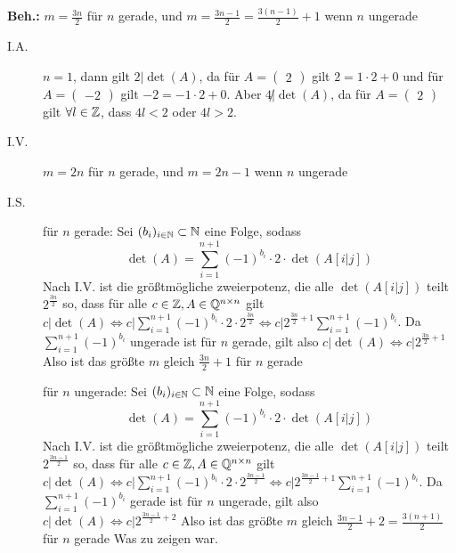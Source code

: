 \documentclass[sectionformat = aufgabe]{gadsescript}
\begin{document}
\textbf{Beh.:} $ m = \frac{3n}{ 2 } $ für $ n $ gerade, und $ m = \frac{3n - 1}{ 2 } = \frac{3(n - 1)}{ 2 } + 1 $ wenn $ n $ ungerade
\begin{description}
	\item[I.A.] $ n = 1 $, dann gilt $ 2 | \det(A) $, da für $ A = \begin{pmatrix} 2 \end{pmatrix}  $ gilt $ 2 = 1 \cdot 2 + 0 $ und für $ A = \begin{pmatrix} -2 \end{pmatrix}  $ gilt $ -2 = -1 \cdot 2 + 0 $.
		Aber $ 4 \not | \det (A) $, da für $ A = \begin{pmatrix} 2 \end{pmatrix}  $ gilt $ \forall l \in \mathbb{Z} $, dass $ 4l < 2 $ oder $ 4l > 2 $.
	\item[I.V.] $ m = 2n  $ für $ n $ gerade, und $ m = 2n - 1 $ wenn $ n $ ungerade
	\item[I.S.]
		für $ n $ gerade:
		Sei $ (b_i)_{i \in \mathbb{N} } \subset \mathbb{N} $ eine Folge, sodass
		\[
			\det(A) = \sum_{i=1}^{n + 1} (-1)^{b_i} \cdot 2 \cdot \det(A[i|j])
		\]
		Nach I.V. ist die größtmögliche zweierpotenz, die alle $ \det(A[i|j]) $ teilt $ 2^{\frac{3n}{ 2 } } $ so, dass
		für alle $ c \in \mathbb{Z} ,  A \in \mathbb{Q} ^{n \times n}  $ gilt
		$ c | \det(A) \iff  c | \sum_{i=1}^{n + 1} (-1)^{b_i} \cdot 2 \cdot 2^{\frac{3n}{ 2 } } \iff c | 2^{\frac{3n}{ 2 } + 1} \sum_{i=1}^{n + 1} (-1)^{b_i} $.
		Da $ \sum_{i=1}^{n + 1} (-1)^{b_i}  $ ungerade ist für $ n $ gerade, gilt also $ c | \det(A) \iff c | 2^{\frac{3n}{ 2 } +1}  $
		Also ist das größte $ m $ gleich $ \frac{3n}{ 2 } + 1 $ für $ n $ gerade

		für $ n $ ungerade:
		Sei $ (b_i)_{i \in \mathbb{N} } \subset \mathbb{N} $ eine Folge, sodass
		\[
			\det(A) = \sum_{i=1}^{n + 1} (-1)^{b_i} \cdot 2 \cdot \det(A[i|j])
		\]
		Nach I.V. ist die größtmögliche zweierpotenz, die alle $ \det(A[i|j]) $ teilt $ 2^{\frac{3n - 1}{ 2 } } $ so, dass
		für alle $ c \in \mathbb{Z} ,  A \in \mathbb{Q} ^{n \times n}  $ gilt
		$ c | \det(A) \iff  c | \sum_{i=1}^{n + 1} (-1)^{b_i} \cdot 2 \cdot 2^{\frac{3n - 1}{ 2 } } \iff c | 2^{\frac{3n - 1}{ 2 } + 1} \sum_{i=1}^{n + 1} (-1)^{b_i} $.
		Da $ \sum_{i=1}^{n + 1} (-1)^{b_i}  $ gerade ist für $ n $ ungerade, gilt also $ c | \det(A) \iff c | 2^{\frac{3n - 1}{ 2 } + 2}  $
		Also ist das größte $ m $ gleich $ \frac{3n - 1}{ 2 } + 2 = \frac{3(n + 1)}{ 2 }  $ für $ n $ gerade
		Was zu zeigen war.
\end{description}
\end{document}
